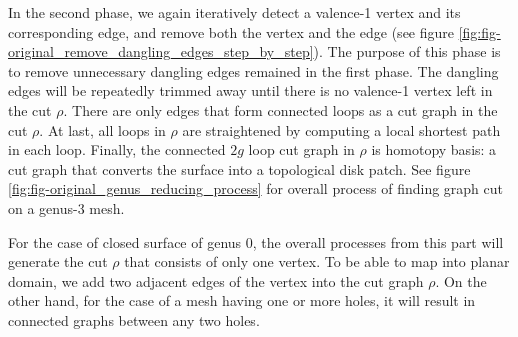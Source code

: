 \documentclass[a4paper,twoside]{article}
\begin{document}
In the second phase, we again iteratively detect a valence-1 vertex and its corresponding edge, and remove both the vertex and the edge (see figure \ref{fig:fig-original_remove_dangling_edges_step_by_step}). The purpose of this phase is to remove unnecessary dangling edges remained in the first phase. The dangling edges will be repeatedly trimmed away until there is no valence-1 vertex left in the cut $\rho$. There are only edges that form connected loops as a cut graph in the cut $\rho$. At last, all loops in $\rho$ are straightened by computing a local shortest path in each loop. Finally, the connected $2g$ loop cut graph in $\rho$ is homotopy basis: a cut graph that converts the surface into a topological disk patch. See figure \ref{fig:fig-original_genus_reducing_process} for overall process of finding graph cut on a genus-3 mesh.



For the case of closed surface of genus 0, the overall processes from this part will generate the cut $\rho$ that consists of only one vertex. To be able to map into planar domain, we add two adjacent edges of the vertex into the cut graph $\rho$. On the other hand, for the case of a mesh having one or more holes, it will result in connected graphs between any two holes.
\end{document}
